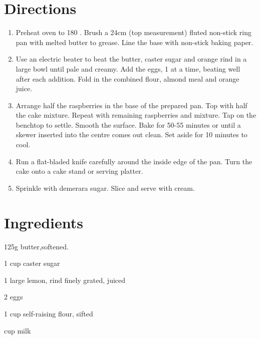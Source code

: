 \section*{Directions}
\begin{enumerate}
	\item Preheat oven to 180 \textcelsius . Brush a 24cm (top measurement) fluted non-stick ring pan with melted butter to grease.
		Line the base with non-stick baking paper.
	\item Use an electric beater to beat the butter, caster sugar and orange rind in a large bowl until pale and creamy.
		Add the eggs, 1 at a time, beating well after each addition. Fold in the combined flour, almond meal and orange juice.
	\item Arrange half the raspberries in the base of the prepared pan. Top with half the cake mixture. Repeat with remaining raspberries and mixture.
		Tap on the benchtop to settle. Smooth the surface. Bake for 50-55 minutes or until a skewer inserted into the centre comes out clean.
		Set aside for 10 minutes to cool.
	\item Run a flat-bladed knife carefully around the inside edge of the pan. Turn the cake onto a cake stand or serving platter.
	\item Sprinkle with demerara sugar. Slice and serve with cream.

\end{enumerate}



\bigskip
\section*{Ingredients}

\begin{ingredients-list}
	\item 125g butter,softened.
	\item 1 cup caster sugar
	\item 1 large lemon, rind finely grated, juiced
	\item 2 eggs
	\item 1 cup  self-raising flour, sifted
	\item {} cup milk
\end{ingredients-list}

